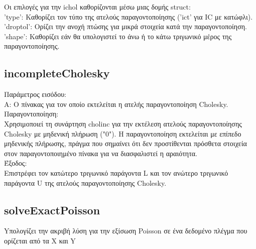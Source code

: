 \documentclass[12pt,a4paper]{article}
\begin{document}
Οι επιλογές για την ichol καθορίζονται μέσω μιας δομής struct:\\
'type': Καθορίζει τον τύπο της ατελούς παραγοντοποίησης ('ict' για IC με κατώφλι).\\
'droptol': Ορίζει την ανοχή πτώσης για μικρά στοιχεία κατά την παραγοντοποίηση.\\
'shape': Καθορίζει εάν θα υπολογιστεί το άνω ή το κάτω τριγωνικό μέρος της παραγοντοποίησης.\\

\subsection{incompleteCholesky}
Παράμετρος εισόδου:\\
A: Ο πίνακας για τον οποίο εκτελείται η ατελής παραγοντοποίηση Cholesky.\\

Παραγοντοποίηση:\\
Χρησιμοποιεί τη συνάρτηση cholinc για την εκτέλεση ατελούς παραγοντοποίησης Cholesky με μηδενική πλήρωση ("0").
Η παραγοντοποίηση εκτελείται με επίπεδο μηδενικής πλήρωσης, πράγμα που σημαίνει ότι δεν προστίθενται πρόσθετα στοιχεία στον παραγοντοποιημένο πίνακα για να διασφαλιστεί η αραιότητα.\\

Έξοδος:\\
Επιστρέφει τον κατώτερο τριγωνικό παράγοντα L και τον ανώτερο τριγωνικό παράγοντα U της ατελούς παραγοντοποίησης Cholesky.

\subsection{solveExactPoisson}
Yπολογίζει την ακριβή λύση για την εξίσωση Poisson σε ένα δεδομένο πλέγμα που ορίζεται από τα X και Y
\end{document}
